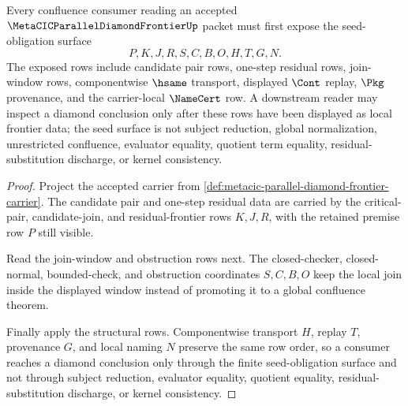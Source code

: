\begin{theorem}
\label{thm:metacic-parallel-diamond-frontier-seed-obligations}
Every confluence consumer reading an accepted $\MetaCICParallelDiamondFrontierUp$ packet must first expose the seed-obligation surface
$$
P,K,J,R,S,C,B,O,H,T,G,N .
$$
The exposed rows include candidate pair rows, one-step residual rows, join-window rows, componentwise $\hsame$ transport, displayed $\Cont$ replay, $\Pkg$ provenance, and the carrier-local $\NameCert$ row. A downstream reader may inspect a diamond conclusion only after these rows have been displayed as local frontier data; the seed surface is not subject reduction, global normalization, unrestricted confluence, evaluator equality, quotient term equality, residual-substitution discharge, or kernel consistency.
\end{theorem}
\begin{proof}
Project the accepted carrier from \autoref{def:metacic-parallel-diamond-frontier-carrier}. The candidate pair and one-step residual data are carried by the critical-pair, candidate-join, and residual-frontier rows $K,J,R$, with the retained premise row $P$ still visible.

Read the join-window and obstruction rows next. The closed-checker, closed-normal, bounded-check, and obstruction coordinates $S,C,B,O$ keep the local join inside the displayed window instead of promoting it to a global confluence theorem.

Finally apply the structural rows. Componentwise transport $H$, replay $T$, provenance $G$, and local naming $N$ preserve the same row order, so a consumer reaches a diamond conclusion only through the finite seed-obligation surface and not through subject reduction, evaluator equality, quotient equality, residual-substitution discharge, or kernel consistency.
\end{proof}

